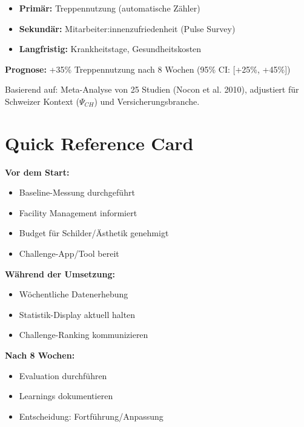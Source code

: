 \documentclass[11pt,a4paper]{article}
\begin{document}
\begin{itemize}
    \item \textbf{Primär:} Treppennutzung (automatische Zähler)
    \item \textbf{Sekundär:} Mitarbeiter:innenzufriedenheit (Pulse Survey)
    \item \textbf{Langfristig:} Krankheitstage, Gesundheitskosten
\end{itemize}

\begin{tcolorbox}[fasuccessbox={Erwartetes Ergebnis}]
\textbf{Prognose:} +35\% Treppennutzung nach 8 Wochen (95\% CI: [+25\%, +45\%])

Basierend auf: Meta-Analyse von 25 Studien (Nocon et al. 2010), adjustiert für Schweizer Kontext ($\Psi_{CH}$) und Versicherungsbranche.
\end{tcolorbox}

\newpage


\section*{\color{fadarkblue}Quick Reference Card}

\begin{tcolorbox}[fainfobox={Checkliste für das Projektteam}]
\textbf{Vor dem Start:}
\begin{itemize}
    \item[$\square$] Baseline-Messung durchgeführt
    \item[$\square$] Facility Management informiert
    \item[$\square$] Budget für Schilder/Ästhetik genehmigt
    \item[$\square$] Challenge-App/Tool bereit
\end{itemize}

\textbf{Während der Umsetzung:}
\begin{itemize}
    \item[$\square$] Wöchentliche Datenerhebung
    \item[$\square$] Statistik-Display aktuell halten
    \item[$\square$] Challenge-Ranking kommunizieren
\end{itemize}

\textbf{Nach 8 Wochen:}
\begin{itemize}
    \item[$\square$] Evaluation durchführen
    \item[$\square$] Learnings dokumentieren
    \item[$\square$] Entscheidung: Fortführung/Anpassung
\end{itemize}
\end{tcolorbox}
\end{document}
